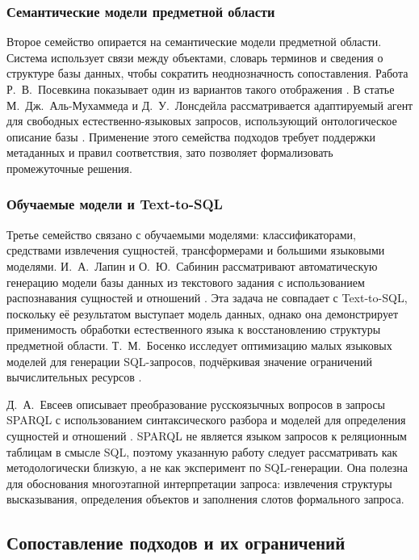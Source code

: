 \subsubsection{Семантические модели предметной области}\par Второе семейство опирается на семантические модели предметной области. Система использует связи между объектами, словарь терминов и сведения о структуре базы данных, чтобы сократить неоднозначность сопоставления. Работа Р.~В.~Посевкина показывает один из вариантов такого отображения \cite{posevkin2018}. В статье М.~Дж.~Аль-Мухаммеда и Д.~У.~Лонсдейла рассматривается адаптируемый агент для свободных естественно-языковых запросов, использующий онтологическое описание базы \cite{almuhammed2022}. Применение этого семейства подходов требует поддержки метаданных и правил соответствия, зато позволяет формализовать промежуточные решения.

\subsubsection{Обучаемые модели и Text-to-SQL}\par Третье семейство связано с обучаемыми моделями: классификаторами, средствами извлечения сущностей, трансформерами и большими языковыми моделями. И.~А.~Лапин и О.~Ю.~Сабинин рассматривают автоматическую генерацию модели базы данных из текстового задания с использованием распознавания сущностей и отношений \cite{lapin2024}. Эта задача не совпадает с Text-to-SQL, поскольку её результатом выступает модель данных, однако она демонстрирует применимость обработки естественного языка к восстановлению структуры предметной области. Т.~М.~Босенко исследует оптимизацию малых языковых моделей для генерации SQL-запросов, подчёркивая значение ограничений вычислительных ресурсов \cite{bosenko2025}.

Д.~А.~Евсеев описывает преобразование русскоязычных вопросов в запросы SPARQL с использованием синтаксического разбора и моделей для определения сущностей и отношений \cite{evseev2021}. SPARQL не является языком запросов к реляционным таблицам в смысле SQL, поэтому указанную работу следует рассматривать как методологически близкую, а не как эксперимент по SQL-генерации. Она полезна для обоснования многоэтапной интерпретации запроса: извлечения структуры высказывания, определения объектов и заполнения слотов формального запроса.

\subsection{Сопоставление подходов и их ограничений}

